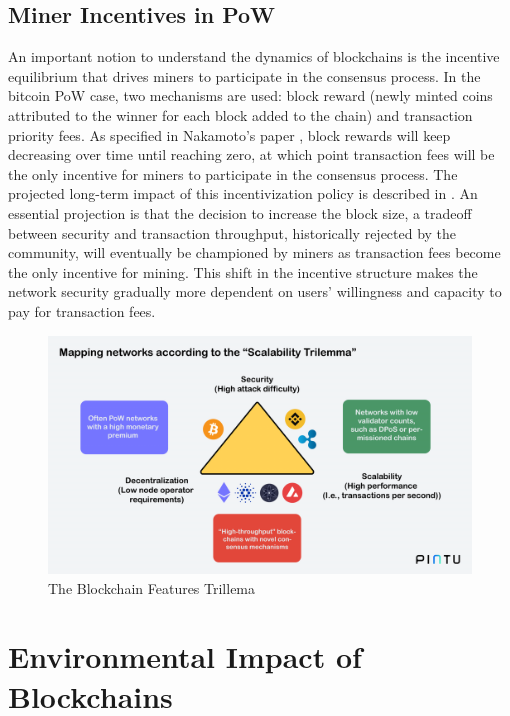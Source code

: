 \documentclass[11pt]{report}
\begin{document}
\subsection{Miner Incentives in \ac{PoW}}

An important notion to understand the dynamics of blockchains is the incentive equilibrium that drives miners to participate in the consensus process. In the bitcoin \ac{PoW} case, two mechanisms are used: block reward (newly minted coins attributed to the winner for each block added to the chain) and transaction priority fees. As specified in Nakamoto's paper \cite{nakamotoBitcoinPeertopeerElectronic2008}, block rewards will keep decreasing over time until reaching zero, at which point transaction fees will be the only incentive for miners to participate in the consensus process. The projected long-term impact of this incentivization policy is described in \cite{easleyMiningMarketsEvolution2019}. An essential projection is that the decision to increase the block size, a tradeoff between security and transaction throughput, historically rejected by the community, will eventually be championed by miners as transaction fees become the only incentive for mining. This shift in the incentive structure makes the network security gradually more dependent on users' willingness and capacity to pay for transaction fees.

\begin{figure}[hbt!]
    \centering
    \centerline{\includegraphics[scale=0.23]{figures/blockchain_trilemma.png}}
    \caption[YO]{The Blockchain Features Trillema}
    \label{fig:blockchain_trilemma}
\end{figure}


\section{Environmental Impact of Blockchains}
\end{document}
